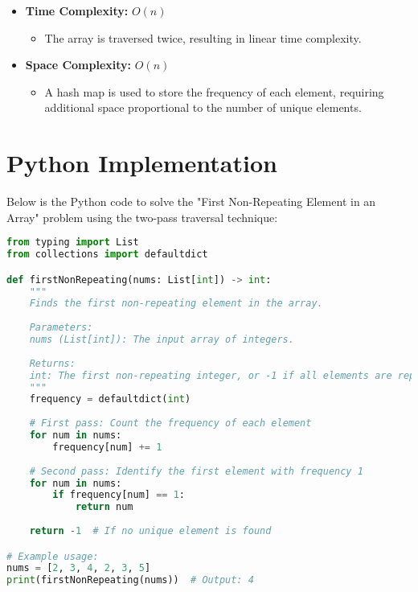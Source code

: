 \begin{itemize}
    \item \textbf{Time Complexity:} \(O(n)\)
    \begin{itemize}
        \item The array is traversed twice, resulting in linear time complexity.
    \end{itemize}
    
    \item \textbf{Space Complexity:} \(O(n)\)
    \begin{itemize}
        \item A hash map is used to store the frequency of each element, requiring additional space proportional to the number of unique elements.
    \end{itemize}
\end{itemize}

\section*{Python Implementation}

Below is the Python code to solve the "First Non-Repeating Element in an Array" problem using the two-pass traversal technique:

\begin{fullwidth}
\begin{lstlisting}[language=Python]
from typing import List
from collections import defaultdict

def firstNonRepeating(nums: List[int]) -> int:
    """
    Finds the first non-repeating element in the array.
    
    Parameters:
    nums (List[int]): The input array of integers.
    
    Returns:
    int: The first non-repeating integer, or -1 if all elements are repeating.
    """
    frequency = defaultdict(int)
    
    # First pass: Count the frequency of each element
    for num in nums:
        frequency[num] += 1
    
    # Second pass: Identify the first element with frequency 1
    for num in nums:
        if frequency[num] == 1:
            return num
    
    return -1  # If no unique element is found

# Example usage:
nums = [2, 3, 4, 2, 3, 5]
print(firstNonRepeating(nums))  # Output: 4
\end{lstlisting}
\end{fullwidth}


